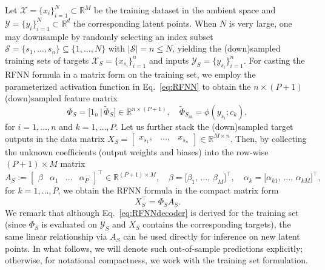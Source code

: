 \documentclass{article}
\begin{document}
Let $\mathcal{X}=\{x_i\}_{i=1}^N\subset\mathbb{R}^M$ be the training dataset in the ambient space and $\mathcal{Y}=\{y_i\}_{i=1}^N\subset\mathbb{R}^d$ the corresponding latent points. When $N$ is very large, one may downsample by randomly selecting an index subset $\mathcal{S}=\{s_1,\dots,s_n\}\subseteq\{1,\dots,N\}$ with $|\mathcal{S}|=n\le N$, yielding the (down)sampled training sets of targets $\mathcal{X}_S=\{x_{s_i}\}_{i=1}^n$ and inputs $\mathcal{Y}_S=\{y_{s_i}\}_{i=1}^n$. For casting the RFNN formula in a matrix form on the training set, we employ the parameterized activation function in Eq.~\eqref{eq:RFNN} to obtain the $n\times (P+1)$ (down)sampled feature matrix 
\begin{equation}
\Phi_S = \big[1_n \, | \, \widetilde{\Phi}_S \big]
\in\mathbb{R}^{n\times (P+1)}, \quad \widetilde{\Phi}_{S_{ik}}=\phi(y_{s_i}; c_{k}),
\label{eq:RFNNBasis}
\end{equation} 
for $i=1,\dots,n$ and $k=1,\dots,P$. Let us further stack the (down)sampled target outputs in the data matrix $X_S = \begin{bmatrix} x_{s_1}, & \ldots, &x_{s_n} \end{bmatrix} \in \mathbb{R}^{M \times n}$. Then, by collecting the unknown coefficients (output weights and biases) into the row-wise $(P+1) \times M$ matrix
\begin{equation}
    A_S := 
\begin{bmatrix}
\beta &
\alpha_1 &
\dots &
\alpha_P
\end{bmatrix}^{\top}
\in\mathbb{R}^{(P+1) \times M}, \quad 
\beta = \bigl[\beta_1,\, \ldots, \, \beta_M \bigr]^\top, \quad
\alpha_k=\bigl[\alpha_{k1},\, \ldots, \,\alpha_{kM}\bigr]^\top, 
\end{equation}
for $k=1,\ldots,P$, we obtain the RFNN formula in the compact matrix form 
\begin{equation}
X^{\top}_{S} = \Phi_S A_S.
\label{eq:RFNNdecoder}
\end{equation}
We remark that although Eq.~\eqref{eq:RFNNdecoder} is derived for the training set (since $\Phi_S$ is evaluated on $\mathcal{Y}_S$ and $X_S$ contains the corresponding targets), the same linear relationship via $A_S$ can be used directly for inference on new latent points. In what follows, we will denote such out‑of‑sample predictions explicitly; otherwise, for notational compactness, we work with the training set formulation.
\end{document}
